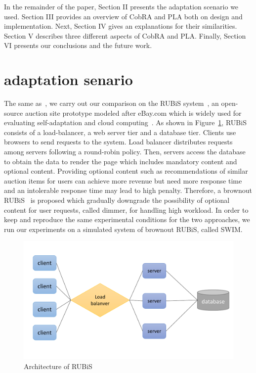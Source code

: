 \documentclass[sigconf]{acmart}
\begin{document}
In the remainder of the paper, Section II presents the adaptation scenario we used. Section III provides an overview of CobRA and PLA both on design and implementation. Next, Section IV gives an explanations for their similarities. Section V describes three different aspects of CobRA and PLA. Finally, Section VI presents our conclusions and the future work.

\section{adaptation senario}
The same as~\cite{moreno2017comparing}, we carry out our comparison on the RUBiS system~\cite{ow22013rubis}, an open-source auction site prototype modeled after eBay.com which is widely used for evaluating self-adaptation and cloud computing~\cite{qin2003survey,islam2015online}. As shown in Figure~\ref{fig:rubis}, RUBiS consists of a load-balancer, a web server tier and a database tier. Clients use browsers to send requests to the system. Load balancer distributes requests among servers following a round-robin policy. Then, servers access the database to obtain the data to render the page which includes mandatory content and optional content. Providing optional content such as recommendations of similar auction items for users can achieve more revenue but need more response time and an intolerable response time may lead to high penalty. Therefore, a brownout RUBiS~\cite{klein2014brownout} is proposed which gradually downgrade the possibility of optional content for user requests, called dimmer, for handling high workload. In order to keep and reproduce the same experimental conditions for the two approaches, we run our experiments on a simulated system of brownout RUBiS, called SWIM.

\begin{figure}[!htp]
	\centering
	\includegraphics[width=\linewidth]{rubis}
	\caption{Architecture of RUBiS}
	\label{fig:rubis}
\end{figure}
\end{document}
